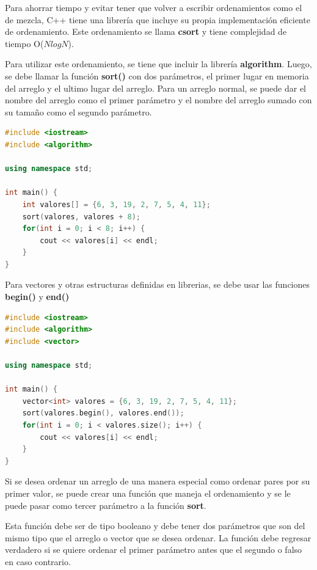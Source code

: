 \documentclass{article}
\begin{document}
Para ahorrar tiempo y evitar tener que volver a escribir ordenamientos como el de mezcla, C++ tiene una librería que incluye su propia implementación eficiente de ordenamiento. Este ordenamiento se llama \textbf{csort} y tiene complejidad de tiempo O($N log N$).

Para utilizar este ordenamiento, se tiene que incluir la librería \textbf{algorithm}. Luego, se debe llamar la función \textbf{sort()} con dos parámetros, el primer lugar en memoria del arreglo y el ultimo lugar del arreglo. Para un arreglo normal, se puede dar el nombre del arreglo como el primer parámetro y el nombre del arreglo sumado con su tamaño como el segundo parámetro.

\begin{lstlisting}[language=C++, caption=Ordenamiento estandar para un arreglo]
#include <iostream>
#include <algorithm>

using namespace std;

int main() {
    int valores[] = {6, 3, 19, 2, 7, 5, 4, 11};
    sort(valores, valores + 8);
    for(int i = 0; i < 8; i++) {
        cout << valores[i] << endl;
    }
}
\end{lstlisting}

Para vectores y otras estructuras definidas en librerias, se debe usar las funciones \textbf{begin()} y \textbf{end()}

\begin{lstlisting}[language=C++, caption=Ordenamiento estandar para un vector]
#include <iostream>
#include <algorithm>
#include <vector>

using namespace std;

int main() {
    vector<int> valores = {6, 3, 19, 2, 7, 5, 4, 11};
    sort(valores.begin(), valores.end());
    for(int i = 0; i < valores.size(); i++) {
        cout << valores[i] << endl;
    }
}
\end{lstlisting}

Si se desea ordenar un arreglo de una manera especial como ordenar pares por su primer valor, se puede crear una función que maneja el ordenamiento y se le puede pasar como tercer parámetro a la función \textbf{sort}.

Esta función debe ser de tipo booleano y debe tener dos parámetros que son del mismo tipo que el arreglo o vector que se desea ordenar. La función debe regresar verdadero si se quiere ordenar el primer parámetro antes que el segundo o falso en caso contrario.
\end{document}
